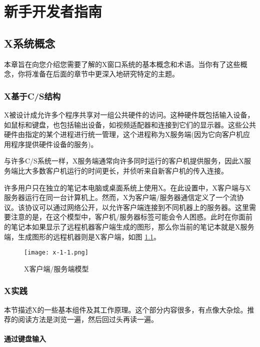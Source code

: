 \chapter{新手开发者指南}

\section{X系统概念}

本章旨在向您介绍您需要了解的X窗口系统的基本概念和术语。当你有了这些概念，你将准备在后面的章节中更深入地研究特定的主题。

\subsection{X基于C/S结构}

X被设计成允许多个程序共享对一组公共硬件的访问。这种硬件既包括输入设备，如鼠标和键盘，也包括输出设备，如视频适配器和连接到它们的显示器。这些公共硬件由指定的某个进程进行统一管理，这个进程称为X服务端(因为它向客户机应用程序提供硬件设备的服务)。


与许多C/S系统一样，X服务端通常向许多同时运行的客户机提供服务，因此X服务端比大多数客户机运行的时间更长，并侦听来自新客户机的传入连接。


许多用户只在独立的笔记本电脑或桌面系统上使用X。在此设置中，X客户端与X服务器运行在同一台计算机上。然而，X为客户端/服务器通信定义了一个流协议。该协议可以通过网络公开，以允许客户端连接到不同机器上的服务器。这里需要注意的是，在这个模型中，客户机/服务器标签可能会令人困惑。此时在你面前的笔记本如果显示了远程机器客户端生成的图形，那么你当前的笔记本就是X服务端，生成图形的远程机器则是X客户端，如图 \ref{img-1.1.1-1}。


\begin{figure}[h]
    \centering
    \texttt{[image: x-1-1.png]}
    \caption{X客户端/服务端模型}
    \label{img-1.1.1-1}
\end{figure}

\subsection{X实践}

本节描述X的一些基本组件及其工作原理。这个部分内容很多，有点像大杂烩。推荐的阅读方法是浏览一遍，然后回过头再读一遍。

\subsubsection{通过键盘输入}

